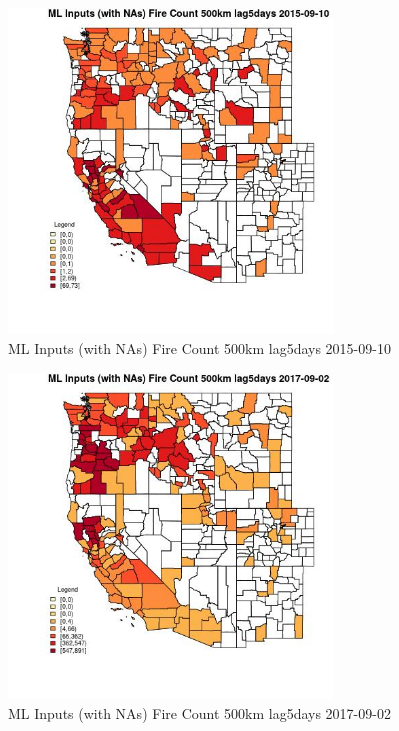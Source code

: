 \begin{figure} 
\centering  
\includegraphics[width=0.77\textwidth]{Code_Outputs/Report_ML_input_PM25_Step4_part_e_de_duplicated_aves_compiled_2019-05-20wNAs_CountyFire_Count_500km_lag5daysMean2015-09-10.jpg} 
\caption{\label{fig:Report_ML_input_PM25_Step4_part_e_de_duplicated_aves_compiled_2019-05-20wNAsCountyFire_Count_500km_lag5daysMean2015-09-10}ML Inputs (with NAs) Fire Count 500km lag5days 2015-09-10} 
\end{figure} 
 

\clearpage 

\begin{figure} 
\centering  
\includegraphics[width=0.77\textwidth]{Code_Outputs/Report_ML_input_PM25_Step4_part_e_de_duplicated_aves_compiled_2019-05-20wNAs_CountyFire_Count_500km_lag5daysMean2017-09-02.jpg} 
\caption{\label{fig:Report_ML_input_PM25_Step4_part_e_de_duplicated_aves_compiled_2019-05-20wNAsCountyFire_Count_500km_lag5daysMean2017-09-02}ML Inputs (with NAs) Fire Count 500km lag5days 2017-09-02} 
\end{figure} 
 

